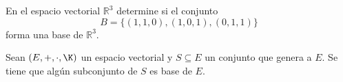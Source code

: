 \documentclass[compacto,10pt]{pubciencias-notas}
\begin{document}

\begin{ejer}\hspace{0pt}
En el espacio vectorial $\mathbb{R}^3$ determine si el conjunto \[B=\{(1,1,0),(1,0,1),(0,1,1)\}\] forma una base de $\mathbb{R}^3$.
\end{ejer}

\begin{prop}
Sean $(E,+,\cdot,\K)$ un espacio vectorial y $S\subseteq E$ un conjunto que genera a $E$. Se tiene que algún subconjunto de $S$ es base de $E$.
\end{prop}
\end{document}
